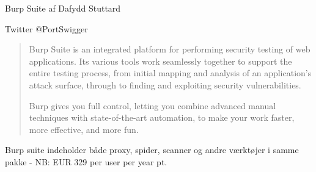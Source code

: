 \documentclass[20pt,landscape,a4paper,footrule]{foils}
\begin{document}











\begin{list1}
\item Burp Suite af Dafydd Stuttard 
\item Twitter @PortSwigger
\end{list1}



\begin{quote}
Burp Suite is an integrated platform for performing security testing of web applications. Its various tools work seamlessly together to support the entire testing process, from initial mapping and analysis of an application's attack surface, through to finding and exploiting security vulnerabilities.

Burp gives you full control, letting you combine advanced manual techniques with state-of-the-art automation, to make your work faster, more effective, and more fun.
\end{quote}

Burp suite indeholder både proxy, spider, scanner og andre værktøjer i samme pakke - NB: EUR 329 per user per year pt.
\end{document}
